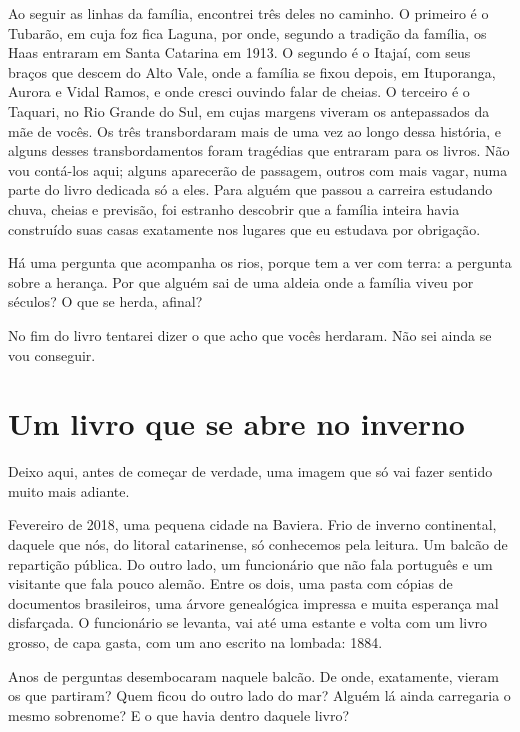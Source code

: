 \documentclass[
  brazilian,
  11pt,
  openany]{book}
\begin{document}
Ao seguir as linhas da família, encontrei três deles no caminho. O
primeiro é o Tubarão, em cuja foz fica Laguna, por onde, segundo a
tradição da família, os Haas entraram em Santa Catarina em 1913. O
segundo é o Itajaí, com seus braços que descem do Alto Vale, onde a
família se fixou depois, em Ituporanga, Aurora e Vidal Ramos, e onde
cresci ouvindo falar de cheias. O terceiro é o Taquari, no Rio Grande do
Sul, em cujas margens viveram os antepassados da mãe de vocês. Os três
transbordaram mais de uma vez ao longo dessa história, e alguns desses
transbordamentos foram tragédias que entraram para os livros. Não vou
contá-los aqui; alguns aparecerão de passagem, outros com mais vagar,
numa parte do livro dedicada só a eles. Para alguém que passou a
carreira estudando chuva, cheias e previsão, foi estranho descobrir que
a família inteira havia construído suas casas exatamente nos lugares que
eu estudava por obrigação.

Há uma pergunta que acompanha os rios, porque tem a ver com terra: a
pergunta sobre a herança. Por que alguém sai de uma aldeia onde a
família viveu por séculos? O que se herda, afinal?

No fim do livro tentarei dizer o que acho que vocês herdaram. Não sei
ainda se vou conseguir.

\section{Um livro que se abre no
inverno}\label{um-livro-que-se-abre-no-inverno}

Deixo aqui, antes de começar de verdade, uma imagem que só vai fazer
sentido muito mais adiante.

Fevereiro de 2018, uma pequena cidade na Baviera. Frio de inverno
continental, daquele que nós, do litoral catarinense, só conhecemos pela
leitura. Um balcão de repartição pública. Do outro lado, um funcionário
que não fala português e um visitante que fala pouco alemão. Entre os
dois, uma pasta com cópias de documentos brasileiros, uma árvore
genealógica impressa e muita esperança mal disfarçada. O funcionário se
levanta, vai até uma estante e volta com um livro grosso, de capa gasta,
com um ano escrito na lombada: 1884.

Anos de perguntas desembocaram naquele balcão. De onde, exatamente,
vieram os que partiram? Quem ficou do outro lado do mar? Alguém lá ainda
carregaria o mesmo sobrenome? E o que havia dentro daquele livro?
\end{document}
